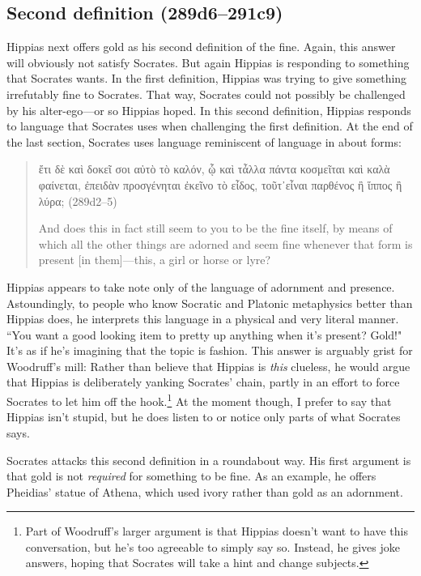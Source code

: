 \documentclass[11pt]{article}
\begin{document}

\subsection{Second definition (289d6--291c9)}

Hippias next offers gold as his second definition of the fine.  Again, this answer will obviously not satisfy Socrates.  But again Hippias is responding to something that Socrates wants.  In the first definition, Hippias was trying to give something irrefutably fine to Socrates.  That way, Socrates could not possibly be challenged by his alter-ego---or so Hippias hoped.  In this second definition, Hippias responds to language that Socrates uses when challenging the first definition. At the end of the last section, Socrates uses language reminiscent of language in  about forms:

\begin{quote}
    ἔτι δὲ καὶ δοκεῖ σοι αὐτὸ τὸ καλόν, ᾧ καὶ τἆλλα πάντα κοσμεῖται καὶ καλὰ φαίνεται, ἐπειδὰν προσγένηται ἐκεῖνο τὸ εἶδος, τοῦτ᾽εἶναι παρθένος ἢ ἵππος ἢ λύρα; (289d2--5)

    And does this in fact still seem to you to be the fine itself, by means of which all the other things are adorned and seem fine whenever that form is present [in them]---this, a girl or horse or lyre?
\end{quote}

Hippias appears to take note only of the language of adornment and presence.  Astoundingly, to people who know Socratic and Platonic metaphysics better than Hippias does, he interprets this language in a physical and very literal manner.  ``You want a good looking item to pretty up anything when it's present?  Gold!"  It's as if he's imagining that the topic is fashion.  This answer is arguably grist for Woodruff's mill: Rather than believe that Hippias is \emph{this} clueless, he would argue that Hippias is deliberately yanking Socrates' chain, partly in an effort to force Socrates to let him off the hook.\footnote{Part of Woodruff's larger argument is that Hippias doesn't want to have this conversation, but he's too agreeable to simply say so.  Instead, he gives joke answers, hoping that Socrates will take a hint and change subjects.}  At the moment though, I prefer to say that Hippias isn't stupid, but he does listen to or notice only parts of what Socrates says.

Socrates attacks this second definition in a roundabout way.  His first argument is that gold is not \emph{required} for something to be fine.  As an example, he offers Pheidias' statue of Athena, which used ivory rather than gold as an adornment.
\end{document}
